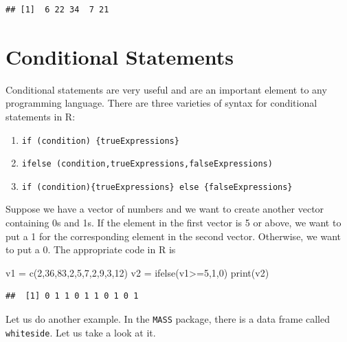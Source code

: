 \documentclass[
]{article}
\newenvironment{Shaded}{\begin{snugshade}}{\end{snugshade}}
\newcommand{\DecValTok}[1]{\textcolor[rgb]{0.00,0.00,0.81}{#1}}
\newcommand{\FunctionTok}[1]{\textcolor[rgb]{0.00,0.00,0.00}{#1}}
\newcommand{\NormalTok}[1]{#1}
\newcommand{\OtherTok}[1]{\textcolor[rgb]{0.56,0.35,0.01}{#1}}
\newcommand{\SpecialCharTok}[1]{\textcolor[rgb]{0.00,0.00,0.00}{#1}}
\providecommand{\tightlist}{%
  \setlength{\itemsep}{0pt}\setlength{\parskip}{0pt}}
\begin{document}
\begin{verbatim}
## [1]  6 22 34  7 21
\end{verbatim}

\hypertarget{conditional-statements}{%
\section{Conditional Statements}\label{conditional-statements}}

Conditional statements are very useful and are an important element to
any programming language. There are three varieties of syntax for
conditional statements in R:

\begin{enumerate}
\def\labelenumi{\arabic{enumi}.}
\tightlist
\item
  \texttt{if\ (condition)\ \{trueExpressions\}}
\item
  \texttt{ifelse\ (condition,trueExpressions,falseExpressions)}
\item
  \texttt{if\ (condition)\{trueExpressions\}\ else\ \{falseExpressions\}}
\end{enumerate}

Suppose we have a vector of numbers and we want to create another vector
containing 0s and 1s. If the element in the first vector is 5 or above,
we want to put a 1 for the corresponding element in the second vector.
Otherwise, we want to put a 0. The appropriate code in R is

\begin{Shaded}
\begin{Highlighting}[]
\NormalTok{v1 }\OtherTok{=} \FunctionTok{c}\NormalTok{(}\DecValTok{2}\NormalTok{,}\DecValTok{36}\NormalTok{,}\DecValTok{83}\NormalTok{,}\DecValTok{2}\NormalTok{,}\DecValTok{5}\NormalTok{,}\DecValTok{7}\NormalTok{,}\DecValTok{2}\NormalTok{,}\DecValTok{9}\NormalTok{,}\DecValTok{3}\NormalTok{,}\DecValTok{12}\NormalTok{)}
\NormalTok{v2 }\OtherTok{=} \FunctionTok{ifelse}\NormalTok{(v1}\SpecialCharTok{\textgreater{}=}\DecValTok{5}\NormalTok{,}\DecValTok{1}\NormalTok{,}\DecValTok{0}\NormalTok{)}
\FunctionTok{print}\NormalTok{(v2)}
\end{Highlighting}
\end{Shaded}

\begin{verbatim}
##  [1] 0 1 1 0 1 1 0 1 0 1
\end{verbatim}

Let us do another example. In the \texttt{MASS} package, there is a data
frame called \texttt{whiteside}. Let us take a look at it.
\end{document}
